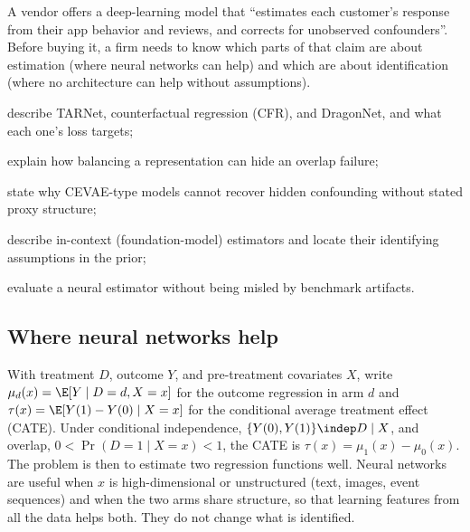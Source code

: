 \documentclass[11pt]{article}
\begin{document}

\begin{decision}
A vendor offers a deep-learning model that ``estimates each customer's response from their app behavior and
reviews, and corrects for unobserved confounders''. Before buying it, a firm needs to know which parts of that
claim are about estimation (where neural networks can help) and which are about identification (where no
architecture can help without assumptions).
\end{decision}

\begin{goals}
  \item describe TARNet, counterfactual regression (CFR), and DragonNet, and what each one's loss targets;
  \item explain how balancing a representation can hide an overlap failure;
  \item state why CEVAE-type models cannot recover hidden confounding without stated proxy structure;
  \item describe in-context (foundation-model) estimators and locate their identifying assumptions in the prior;
  \item evaluate a neural estimator without being misled by benchmark artifacts.
\end{goals}

\sectionone

\subsection{Where neural networks help}

With treatment $D$, outcome $Y$, and pre-treatment covariates $X$, write $\mu_d(x) = \E[Y \mid D=d, X=x]$ for the
outcome regression in arm $d$ and $\tau(x) = \E[Y(1) - Y(0) \mid X=x]$ for the conditional average treatment effect
(CATE). Under conditional independence, $\{Y(0), Y(1)\} \indep D \mid X$, and overlap, $0 < \Pr(D=1 \mid X=x) < 1$,
the CATE is $\tau(x) = \mu_1(x) - \mu_0(x)$. The problem is then to estimate two regression functions well. Neural networks are
useful when $x$ is high-dimensional or unstructured (text, images, event sequences) and when the two arms
share structure, so that learning features from all the data helps both. They do not change what is identified.
\end{document}
